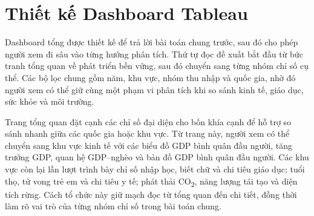 \section{Thiết kế Dashboard Tableau}

Dashboard tổng được thiết kế để trả lời bài toán chung trước, sau đó cho phép người xem đi sâu vào từng hướng phân tích. Thứ tự đọc đề xuất bắt đầu từ bức tranh tổng quan về phát triển bền vững, sau đó chuyển sang từng nhóm chỉ số cụ thể. Các bộ lọc chung gồm năm, khu vực, nhóm thu nhập và quốc gia, nhờ đó người xem có thể giữ cùng một phạm vi phân tích khi so sánh kinh tế, giáo dục, sức khỏe và môi trường.

Trang tổng quan đặt cạnh các chỉ số đại diện cho bốn khía cạnh để hỗ trợ so sánh nhanh giữa các quốc gia hoặc khu vực. Từ trang này, người xem có thể chuyển sang khu vực kinh tế với các biểu đồ GDP bình quân đầu người, tăng trưởng GDP, quan hệ GDP--nghèo và bản đồ GDP bình quân đầu người. Các khu vực còn lại lần lượt trình bày chỉ số nhập học, biết chữ và chi tiêu giáo dục; tuổi thọ, tử vong trẻ em và chi tiêu y tế; phát thải CO\textsubscript{2}, năng lượng tái tạo và diện tích rừng. Cách tổ chức này giữ mạch đọc từ tổng quan đến chi tiết, đồng thời làm rõ vai trò của từng nhóm chỉ số trong bài toán chung.

{\captionsetup{justification=centering,singlelinecheck=true}






}
